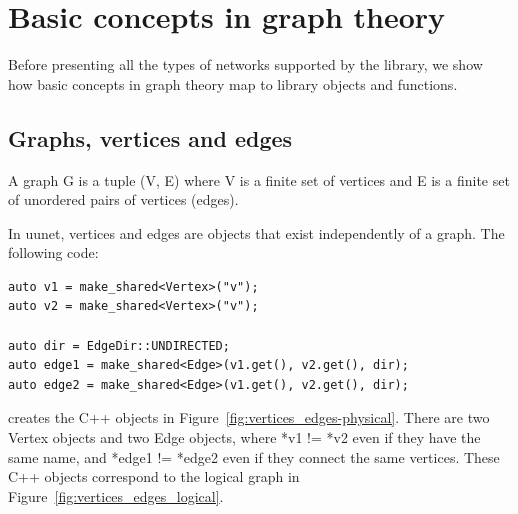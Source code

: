 \chapter{Basic concepts in graph theory}
\label{ch:graphtheory}

Before presenting all the types of networks supported by the library, we show how basic concepts in graph theory map to library objects and functions.

\section{Graphs, vertices and edges}

\begin{definition}[Graph]
A graph G is a tuple (V, E) where V is a finite set of vertices and E is a finite set of unordered pairs of vertices (edges).
\end{definition}

In uunet, vertices and edges are objects that exist independently of a graph. The following code:

\begin{lstlisting}[style=c++]
auto v1 = make_shared<Vertex>("v");
auto v2 = make_shared<Vertex>("v");
    
auto dir = EdgeDir::UNDIRECTED;
auto edge1 = make_shared<Edge>(v1.get(), v2.get(), dir);
auto edge2 = make_shared<Edge>(v1.get(), v2.get(), dir);
\end{lstlisting}

\noindent creates the C++ objects in Figure~\ref{fig:vertices_edges-physical}. There are two Vertex objects and two Edge objects, where *v1 != *v2 even if they have the same name, and *edge1 != *edge2 even if they connect the same vertices.
These C++ objects correspond to the logical graph in Figure~\ref{fig:vertices_edges_logical}.

